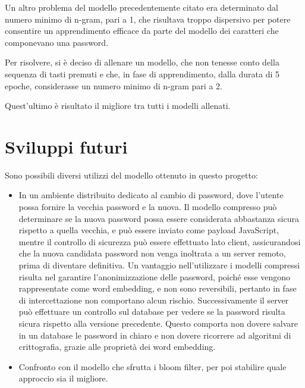 Un altro problema del modello precedentemente citato era determinato dal numero minimo di n-gram, pari a 1, che risultava troppo dispersivo per potere consentire un apprendimento efficace da parte del modello dei caratteri che componevano una password.

Per risolvere, si è deciso di allenare un modello, che non tenesse conto della sequenza di tasti premuti e che, in fase di apprendimento, dalla durata di 5 epoche, considerasse un numero minimo di n-gram pari a 2.

Quest'ultimo è risultato il migliore tra tutti i modelli allenati.

\section{Sviluppi futuri}
Sono possibili diversi utilizzi del modello ottenuto in questo progetto:
\begin{itemize}
    \item In un ambiente distribuito dedicato al cambio di password, dove l'utente possa fornire la vecchia password e la nuova. Il modello compresso può determinare se la nuova password possa essere considerata abbastanza sicura rispetto a quella vecchia, e può essere inviato come payload JavaScript, mentre il controllo di sicurezza può essere effettuato lato client, assicurandosi che la nuova candidata password non venga inoltrata a un server remoto, prima di diventare definitiva.
    Un vantaggio nell'utilizzare i modelli compressi risulta nel garantire l'anonimizzazione delle password, poiché esse vengono rappresentate come word embedding, e non sono reversibili, pertanto in fase di intercettazione non comportano alcun rischio. Successivamente il server può effettuare un controllo sul database per vedere se la password risulta sicura rispetto alla versione precedente. Questo comporta non dovere salvare in un database le password in chiaro e non dovere ricorrere ad algoritmi di crittografia, grazie alle proprietà dei word embedding.
    \item Confronto con il modello che sfrutta i bloom filter, per poi stabilire quale approccio sia il migliore.
\end{itemize}
